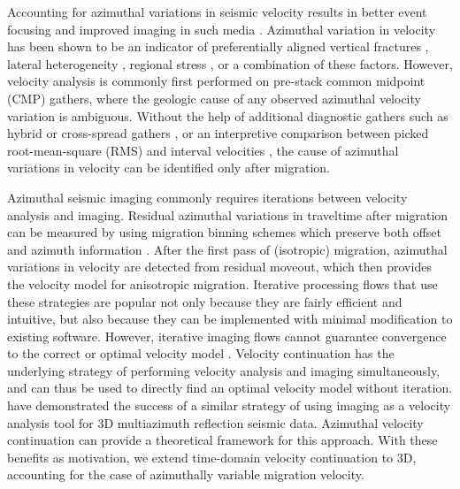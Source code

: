 Accounting for azimuthal variations in seismic velocity results in better event focusing and improved imaging in such media \cite[]{sicking_nelan08}.  
Azimuthal variation in velocity has been shown to be an indicator of preferentially aligned vertical fractures \cite[]{crampin84}, lateral heterogeneity \cite[]{GEO50-11-20262032}, regional stress \cite[]{sicking_nelan_mclain07}, or a combination of these factors.  
However, velocity analysis is commonly first performed on pre-stack common midpoint (CMP) gathers, where the geologic cause of any observed azimuthal velocity variation is ambiguous.  
Without the help of additional diagnostic gathers such as hybrid or cross-spread gathers \cite[]{GEO36-06-10991137}, or an interpretive comparison between picked root-mean-square (RMS) and interval velocities \cite[]{jenner08}, the cause of azimuthal variations in velocity can be identified only after migration.  

Azimuthal seismic imaging commonly requires iterations between velocity analysis and imaging.  
Residual azimuthal variations in traveltime after migration can be measured by using migration binning schemes which preserve both offset and azimuth information \cite[]{cary99,vermeer99}.
After the first pass of (isotropic) migration, azimuthal variations in velocity are detected from residual moveout, which then provides the velocity model for anisotropic migration.  
Iterative processing flows that use these strategies are popular not only because they are fairly efficient and intuitive, but also because they can be implemented with minimal modification to existing software.  However, iterative imaging flows cannot guarantee convergence to the correct or optimal velocity model \cite[]{FBR08-06-02240234}.  
Velocity continuation has the underlying strategy of performing velocity analysis and imaging simultaneously, and can thus be used to directly find an optimal velocity model without iteration.  \cite{sicking_nelan_mclain07} have demonstrated the success of a similar strategy of using imaging as a velocity analysis tool for 3D multiazimuth reflection seismic data.  
Azimuthal velocity continuation can provide a theoretical framework for this approach.  
With these benefits as motivation, we extend time-domain velocity continuation to 3D, accounting for the case of azimuthally variable migration velocity.

